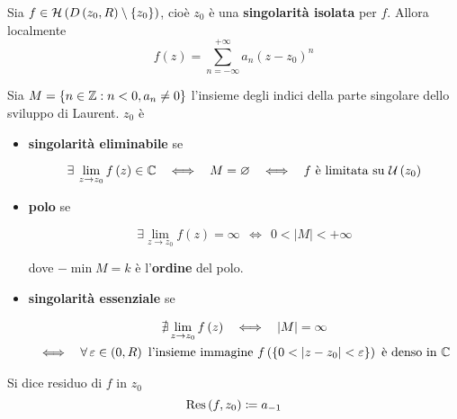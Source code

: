 \Soluzione
\begin{thm}
Sia $f\in \mathcal{H} \left(D\left(z_{0}, R\right) \setminus \left\{z_{0}\right\}\right)$, cioè $z_{0}$ è una \textbf{singolarità isolata} per $f$. Allora localmente
\begin{equation*}
f\left(z\right) = \sum\limits^{+ \infty}_{n = -\infty} a_{n}\left(z - z_{0}\right)^{n}
\end{equation*}
\end{thm}
\begin{thm}
Sia $M = \left\{n\in \mathbb{Z}  :n < 0, a_{n} \neq 0\right\}$ l'insieme degli indici della parte singolare dello sviluppo di Laurent. $z_{0}$ è

\begin{itemize}
\item \textbf{singolarità eliminabile} se

\begin{equation*}
\exists \lim\limits_{z\rightarrow z_{0}} f\left(z\right) \in \CC  \ \ \iff \ \ M = \emptyset \ \ \iff \ \ f\ \text{è limitata su} \ \Uc \left(z_{0}\right)
\end{equation*}
\item \textbf{polo} se

\begin{equation*}
\exists \lim\limits_{z\rightarrow z_{0}} f\left(z\right) = \infty \ \ \iff \ \ 0 < \left| M\right| < + \infty 
\end{equation*}

dove $ - \min M = k$ è l'\textbf{ordine} del polo.
\item \textbf{singolarità essenziale} se

\begin{gather*}
\nexists \lim\limits_{z\rightarrow z_{0}} f\left(z\right) \ \ \iff \ \ \left| M\right| = \infty \\
\iff \ \ \forall \varepsilon \in \left(0, R\right) \ \text{l'insieme immagine} \ f\left(\left\{0 < \left| z - z_{0}\right| < \varepsilon \right\}\right) \ \text{è denso in} \ \CC 
\end{gather*}
\end{itemize}
\end{thm}
\begin{defn}
Si dice residuo di $f$ in $z_{0}$
\begin{equation*}
\operatorname{Res} \left(f, z_{0}\right) \coloneqq a_{- 1}
\end{equation*}
\end{defn}
